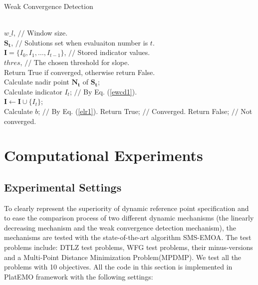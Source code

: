 \documentclass[conference]{IEEEtran}
\begin{document}
\begin{algorithm}
  \caption{Weak Convergence Detection}
  \label{alg:wcd}
  \begin{algorithmic}
  \REQUIRE ~~\\
    $w\_l$, $//$ Window size.\\
    $\boldsymbol{S_{t}}$, $//$ Solutions set when evaluaiton number is $t$.\\
    $\boldsymbol I = \{I_{0},I_{1},\dots,I_{t-1}\}$, $//$ Stored indicator values. \\
    $thres$, $//$ The chosen threshold for slope. \\ 
  \ENSURE Return True if converged, otherwise return False.~~\\
    Calculate nadir point $\boldsymbol{N_{t}}$ of $\boldsymbol{S_{t}}$; \\
    Calculate indicator $I_{t}$; $//$ By Eq. (\ref{ewcd1}). \\
    $\boldsymbol I \gets \boldsymbol I \cup \{I_{t}\}$; \\
    \STATE Calculate $b$; $//$ By Eq. (\ref{elr1}).
      \STATE Return True; $//$ Converged.
      \ENDIF
    \ENDIF
    \STATE Return False; $//$ Not converged.
  \end{algorithmic}
\end{algorithm}
% 
% 
%
\section{Computational Experiments}
\subsection{Experimental Settings}
To clearly represent the superiority of dynamic reference point specification 
and to ease the comparison process of two different dynamic mechanisms
(the linearly decreasing mechanism and the weak convergence detection mechanism), 
the mechanisms are tested with the state-of-the-art algorithm SMS-EMOA\cite{smsemoa}.
The test problems include: 
DTLZ\cite{DTLZ} test problems, WFG\cite{WFG} test problems, their minus-versions\cite{minusTestProblem} 
and a Multi-Point Distance Minimization Problem(MPDMP)\cite{dmp}.
We test all the problems with 10 objectives. 
All the code in this section is implemented in PlatEMO framework\cite{PlatEMO} 
with the following settings:
\end{document}
